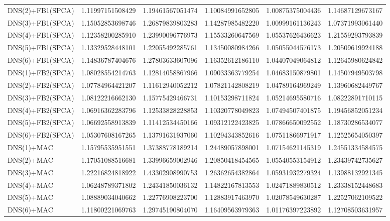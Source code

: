 \begin{table}[h]
\begin{adjustbox}{totalheight=\baselineskip}
\begin{tabular}{lSSSSS}
DNS(2)+FB1(SPCA) & 1.11997151508429 & 1.19461567051474 & 1.10084991652805 & 1.00875375004436 & 1.14687129673167 \\ 
DNS(3)+FB1(SPCA) & 1.15052853698746 & 1.26879839803283 & 1.14287985482220 & 1.00999161136243 & 1.07371993061440 \\ 
DNS(4)+FB1(SPCA) & 1.12358200285910 & 1.23990096776973 & 1.15533260647569 & 1.05537626436623 & 1.21559293793839 \\ 
DNS(5)+FB1(SPCA) & 1.13329528448101 & 1.22055492285761 & 1.13450080984266 & 1.05055044576173 & 1.20509619924188 \\ 
DNS(6)+FB1(SPCA) & 1.14836787404676 & 1.27803633607096 & 1.16352612186110 & 1.04407049064812 & 1.12645980624842 \\ 
DNS(1)+FB2(SPCA) & 1.08028554214763 & 1.12814058867966 & 1.09033363779254 & 1.04683150879801 & 1.14507949503798 \\ 
DNS(2)+FB2(SPCA) & 1.07784964421207 & 1.11612940052212 & 1.07821142808219 & 1.04789164969249 & 1.13960682449767 \\ 
DNS(3)+FB2(SPCA) & 1.08122216662130 & 1.15775429466731 & 1.10153298711824 & 1.05214695580716 & 1.08222891710115 \\ 
DNS(4)+FB2(SPCA) & 1.06916362283796 & 1.12533828228853 & 1.10320778049823 & 1.07494507401875 & 1.19456852051234 \\ 
DNS(5)+FB2(SPCA) & 1.06692558913839 & 1.11412534450166 & 1.09312122423825 & 1.07866650092552 & 1.18730286534077 \\ 
DNS(6)+FB2(SPCA) & 1.05307608167265 & 1.13791631937060 & 1.10294343852616 & 1.07511866971917 & 1.12525654050397 \\ 
DNS(1)+MAC & 1.15795535951551 & 1.37388778189214 & 1.24489057898001 & 1.07154621145319 & 1.24551334584575 \\ 
DNS(2)+MAC & 1.17051088516681 & 1.33996659002946 & 1.20850418454565 & 1.05540553154912 & 1.23439742735627 \\ 
DNS(3)+MAC & 1.22216824818922 & 1.43302908990753 & 1.26362654382864 & 1.05931932279324 & 1.13988132921345 \\ 
DNS(4)+MAC & 1.06248789371802 & 1.24341850036132 & 1.14822167813553 & 1.02471889830512 & 1.23338152448683 \\ 
DNS(5)+MAC & 1.08889034040662 & 1.22776908223700 & 1.12883917463970 & 1.02078549630287 & 1.22527062109522 \\ 
DNS(6)+MAC & 1.11800221069763 & 1.29745190804070 & 1.16409563979363 & 1.01176397223892 & 1.12708503631957 \\ 

\end{tabular}
\end{adjustbox}
\end{table}
